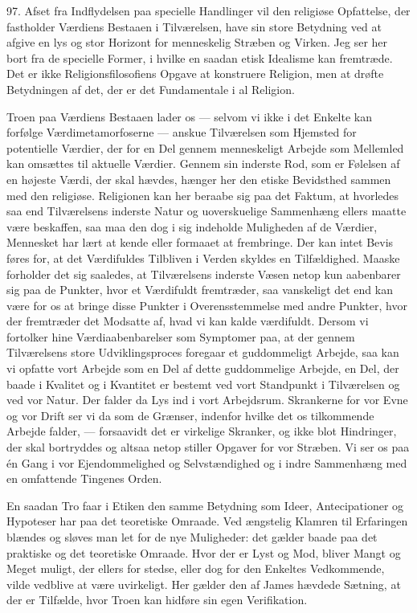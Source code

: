 \documentclass[12pt,a4paper,openany]{book}
\newcommand{\opage}[1]{\marginnote{\footnotesize\textit{[#1]}}}
\begin{document}
97. Afset fra Indflydelsen paa specielle Handlinger vil den religiøse
Opfattelse, der fastholder Værdiens Bestaaen i Tilværelsen, have sin
store Betydning ved at afgive en lys og stor Horizont for menneskelig
Stræben og Virken. Jeg ser her bort fra de specielle Former, i hvilke en
saadan etisk Idealisme kan fremtræde. Det er ikke Religionsfilosofiens
Opgave at konstruere Religion, men at drøfte Betydningen af det, der er
det Fundamentale i al Religion.

Troen paa Værdiens Bestaaen lader os --- selvom vi ikke i det Enkelte
kan forfølge Værdimetamorfoserne --- anskue Tilværelsen som Hjemsted for
potentielle Værdier, der for en Del gennem menneskeligt Arbejde som
Mellemled kan omsættes til aktuelle Værdier. Gennem sin inderste Rod,
som er Følelsen af en højeste Værdi, der skal hævdes, hænger her den
etiske Bevidsthed sammen med den religiøse. Religionen kan her beraabe
sig paa det Faktum, at hvorledes saa end Tilværelsens inderste Natur og
uoverskuelige Sammenhæng ellers maatte være beskaffen, saa maa den dog i
sig indeholde Muligheden af de Værdier, Mennesket har lært at kende
eller formaaet at frembringe. Der kan intet Bevis føres for, at det
Værdifuldes Tilbliven i Verden skyldes en Tilfældighed. Maaske forholder
det sig saaledes, at Tilværelsens inderste Væsen netop kun aabenbarer
sig paa de Punkter, hvor et Værdifuldt fremtræder, saa vanskeligt det
end kan være for os at bringe disse Punkter i Overensstemmelse med andre
Punkter, hvor der fremtræder det Modsatte af, hvad vi kan kalde
værdifuldt. Dersom vi fortolker hine Værdiaabenbarelser som Symptomer
paa, at der gennem Tilværelsens store Udviklingsproces foregaar et
guddommeligt Arbejde, saa kan vi opfatte vort Arbejde som en Del af
dette guddommelige Arbejde, en Del, der baade i Kvalitet og i Kvantitet
er bestemt ved vort Standpunkt i Tilværelsen og ved vor Natur. Der
falder da Lys
\opage{222}ind i vort Arbejdsrum. Skrankerne for vor Evne og vor Drift
ser vi da som de Grænser, indenfor hvilke det os tilkommende Arbejde
falder, --- forsaavidt det er virkelige Skranker, og ikke blot
Hindringer, der skal bortryddes og altsaa netop stiller Opgaver for vor
Stræben. Vi ser os paa én Gang i vor Ejendommelighed og Selvstændighed
og i indre Sammenhæng med en omfattende Tingenes Orden.

En saadan Tro faar i Etiken den samme Betydning som Ideer,
Antecipationer og Hypoteser har paa det teoretiske Omraade. Ved
ængstelig Klamren til Erfaringen blændes og sløves man let for de nye
Muligheder: det gælder baade paa det praktiske og det teoretiske
Omraade. Hvor der er Lyst og Mod, bliver Mangt og Meget muligt, der
ellers for stedse, eller dog for den Enkeltes Vedkommende, vilde
vedblive at være uvirkeligt. Her gælder den af James hævdede Sætning, at
der er Tilfælde, hvor Troen kan hidføre sin egen Verifikation.
\end{document}

